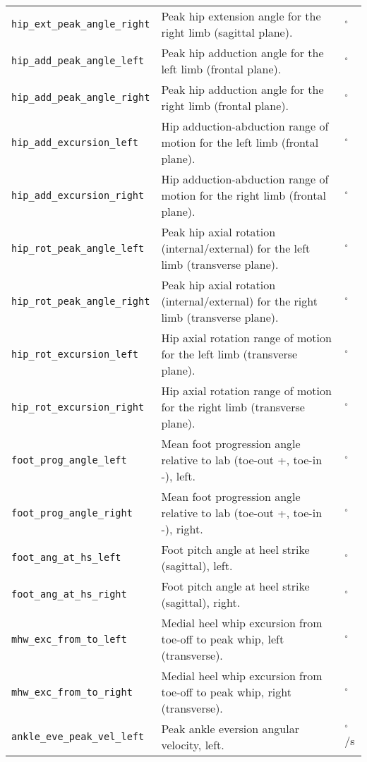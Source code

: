 \begin{longtable}{@{}l p{} l@{}}
    \texttt{hip\_ext\_peak\_angle\_right} & Peak hip extension angle for the right limb (sagittal plane). & $^\circ$ \\
    \texttt{hip\_add\_peak\_angle\_left} & Peak hip adduction angle for the left limb (frontal plane). & $^\circ$ \\
    \texttt{hip\_add\_peak\_angle\_right} & Peak hip adduction angle for the right limb (frontal plane). & $^\circ$ \\
    \texttt{hip\_add\_excursion\_left} & Hip adduction-abduction range of motion for the left limb (frontal plane). & $^\circ$ \\
    \texttt{hip\_add\_excursion\_right} & Hip adduction-abduction range of motion for the right limb (frontal plane). & $^\circ$ \\
    \texttt{hip\_rot\_peak\_angle\_left} & Peak hip axial rotation (internal/external) for the left limb (transverse plane). & $^\circ$ \\
    \texttt{hip\_rot\_peak\_angle\_right} & Peak hip axial rotation (internal/external) for the right limb (transverse plane). & $^\circ$ \\
    \texttt{hip\_rot\_excursion\_left} & Hip axial rotation range of motion for the left limb (transverse plane). & $^\circ$ \\
    \texttt{hip\_rot\_excursion\_right} & Hip axial rotation range of motion for the right limb (transverse plane). & $^\circ$ \\
    \texttt{foot\_prog\_angle\_left} & Mean foot progression angle relative to lab (toe-out +, toe-in -), left. & $^\circ$ \\
    \texttt{foot\_prog\_angle\_right} & Mean foot progression angle relative to lab (toe-out +, toe-in -), right. & $^\circ$ \\
    \texttt{foot\_ang\_at\_hs\_left} & Foot pitch angle at heel strike (sagittal), left. & $^\circ$ \\
    \texttt{foot\_ang\_at\_hs\_right} & Foot pitch angle at heel strike (sagittal), right. & $^\circ$ \\
    \texttt{mhw\_exc\_from\_to\_left} & Medial heel whip excursion from toe-off to peak whip, left (transverse). & $^\circ$ \\
    \texttt{mhw\_exc\_from\_to\_right} & Medial heel whip excursion from toe-off to peak whip, right (transverse). & $^\circ$ \\
    \texttt{ankle\_eve\_peak\_vel\_left} & Peak ankle eversion angular velocity, left. & $^\circ$/s \\

\end{longtable}
